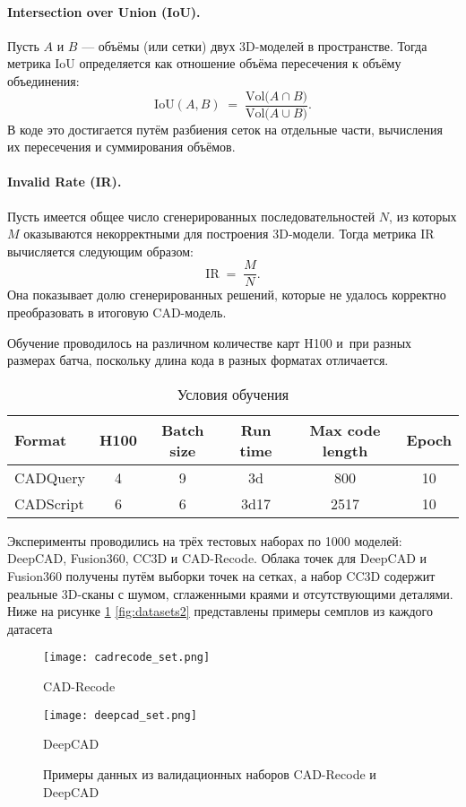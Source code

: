 \paragraph{Intersection over Union (IoU).}
Пусть \( A \) и \( B \) --- объёмы (или сетки) двух 3D-моделей в пространстве.
Тогда метрика IoU определяется как отношение объёма пересечения к объёму объединения:
\[
    \mathrm{IoU}(A, B) \;=\; \frac{\mathrm{Vol}\bigl(A \cap B\bigr)}
    {\mathrm{Vol}\bigl(A \cup B\bigr)}.
\]
В коде это достигается путём разбиения сеток на отдельные части,
вычисления их пересечения и суммирования объёмов.

\paragraph{Invalid Rate (IR).}
Пусть имеется общее число сгенерированных последовательностей \(N\),
из которых \(M\) оказываются некорректными для построения 3D-модели.
Тогда метрика IR вычисляется следующим образом:
\[
    \mathrm{IR} \;=\; \frac{M}{N}.
\]
Она показывает долю сгенерированных решений, которые не удалось корректно
преобразовать в итоговую CAD-модель.

Обучение проводилось на различном количестве карт H100 и~при разных размерах
батча, поскольку длина кода в разных форматах отличается.

\begin{table}[h!]
    \centering
    \caption{Условия обучения}
    \begin{tabular}{|l|c|c|c|c|c|}
        \hline
        Format    & H100 & Batch size & Run time & Max code length & Epoch \\ \hline
        CADQuery  & 4    & 9          & 3d       & 800             & 10    \\ \hline
        CADScript & 6    & 6          & 3d17     & 2517            & 10    \\ \hline
    \end{tabular}
\end{table}

Эксперименты проводились на трёх тестовых наборах по 1000 моделей: DeepCAD,
Fusion360, CC3D и CAD-Recode. Облака точек для DeepCAD и Fusion360 получены путём выборки точек на сетках, а набор
CC3D содержит реальные 3D-сканы с шумом, сглаженными краями и отсутствующими деталями.
Ниже на рисунке \ref{fig:datasets1} \ref{fig:datasets2} представлены примеры семплов из каждого датасета

\newpage

\begin{figure}[h!]
    \centering
    \texttt{[image: cadrecode\_set.png]}
    \caption{CAD-Recode}

    \vspace{1em}

    \texttt{[image: deepcad\_set.png]}
    \caption{DeepCAD}

    \caption{Примеры данных из валидационных наборов CAD-Recode и DeepCAD}
    \label{fig:datasets1}
\end{figure}

